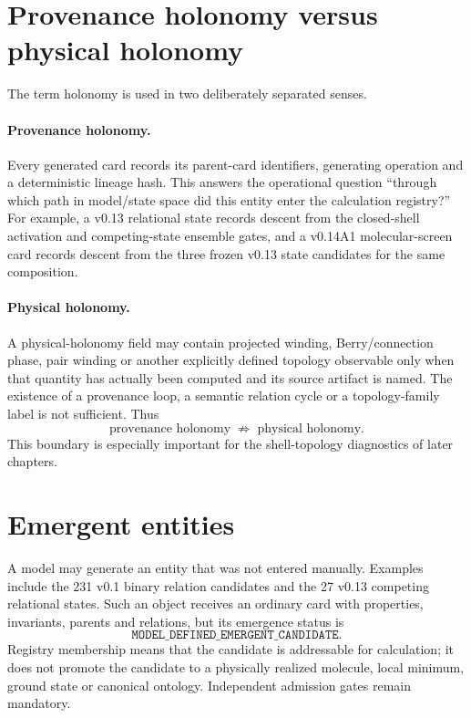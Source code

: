 \section{Provenance holonomy versus physical holonomy}
The term holonomy is used in two deliberately separated senses.

\paragraph{Provenance holonomy.}
Every generated card records its parent-card identifiers, generating operation and a deterministic lineage hash.  This answers the operational question ``through which path in model/state space did this entity enter the calculation registry?''  For example, a v0.13 relational state records descent from the closed-shell activation and competing-state ensemble gates, and a v0.14A1 molecular-screen card records descent from the three frozen v0.13 state candidates for the same composition.

\paragraph{Physical holonomy.}
A physical-holonomy field may contain projected winding, Berry/connection phase, pair winding or another explicitly defined topology observable only when that quantity has actually been computed and its source artifact is named.  The existence of a provenance loop, a semantic relation cycle or a topology-family label is not sufficient.  Thus
\begin{equation}
\text{provenance holonomy}\;\not\Rightarrow\;\text{physical holonomy}.
\end{equation}
This boundary is especially important for the shell-topology diagnostics of later chapters.

\section{Emergent entities}
A model may generate an entity that was not entered manually.  Examples include the 231 v0.1 binary relation candidates and the 27 v0.13 competing relational states.  Such an object receives an ordinary card with properties, invariants, parents and relations, but its emergence status is
\begin{equation}
\texttt{MODEL\_DEFINED\_EMERGENT\_CANDIDATE}.
\end{equation}
Registry membership means that the candidate is addressable for calculation; it does not promote the candidate to a physically realized molecule, local minimum, ground state or canonical ontology.  Independent admission gates remain mandatory.


